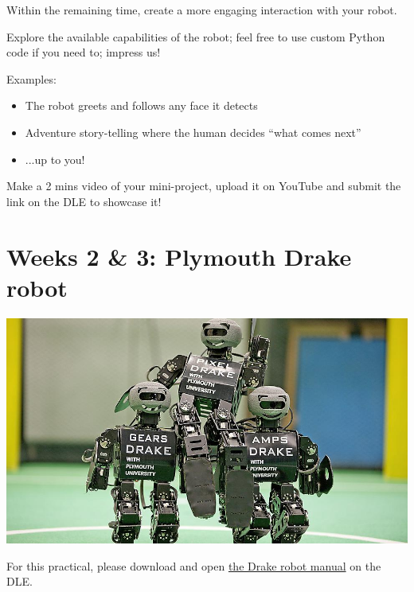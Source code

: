 \documentclass{instructions}
\begin{document}


Within the remaining time, create a more engaging interaction with your robot.

Explore the available capabilities of the robot; feel free to use custom Python
code if you need to; impress us!

Examples:

\begin{itemize}
    \item The robot greets and follows any face it detects
    \item Adventure story-telling where the human decides “what comes next”
    \item ...up to you!
\end{itemize}

Make a 2 mins video of your mini-project, upload it on YouTube and submit the
link on the DLE to showcase it!

\part{Weeks 2 \& 3: Plymouth Drake robot}

\begin{center}
    \includegraphics[width=0.9\linewidth]{figs/drake}
\end{center}

For this practical, please download and open
\href{https://dle.plymouth.ac.uk/mod/equella/view.php?id=471210}{the Drake robot
manual} on the DLE.
\end{document}
